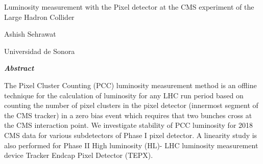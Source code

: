 \documentclass[final,3p]{CSP}
\def\Student{Ashish Sehrawat}
\def\Universidad{Universidad de Sonora}
\def\ProjectTitle{Luminosity measurement with the Pixel detector at the CMS experiment of the Large Hadron Collider }
\begin{document}
\begin{adjustwidth}{1cm}{1cm}

  \begin{center}
    {\Large \ProjectTitle \par}
    \vspace{0.5cm}

    {\Student \par}
    {\Universidad \par}  
    \vspace{1cm}
    
    {\itshape\textbf{Abstract}\par}
     \vspace{0.7 cm}
        
    \end{center}  

 
    \onehalfspacing
    The Pixel Cluster Counting (PCC) luminosity measurement method is an offline technique for the calculation of  luminosity for any LHC run period based on counting the number of pixel clusters in the pixel detector (innermost segment of the CMS tracker) in a zero bias event which requires that two bunches cross at the CMS interaction point. We investigate stability of PCC luminosity for 2018 CMS data for various subdetectors of Phase I pixel detector. A linearity study is also performed for Phase II High luminosity (HL)- LHC luminosity measurement device Tracker Endcap Pixel Detector (TEPX).

\end{adjustwidth}

\hspace{2pt}
\vspace{1 cm}

\clearpage
\shipout\null


\newpage
\tableofcontents

\clearpage
\newpage





















\cleardoublepage
\onehalfspacing


\end{document}
